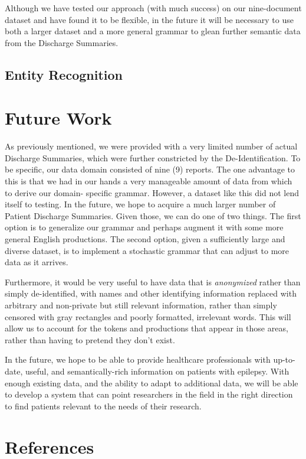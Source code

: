 \documentclass{acm_proc_article-sp}
\begin{document}
Although we have tested our approach (with much success) on our nine-document dataset and have found it
to be flexible, in the future it will be necessary
to use both a larger dataset and a more general grammar to glean further semantic
data from the Discharge Summaries.
\subsection{Entity Recognition}
\section{Future Work}
As previously mentioned, we were provided with a very limited number of actual Discharge
Summaries, which were further constricted by the De-Identification. To be specific,
our data domain consisted of nine (9) reports. The one advantage to this is that we
had in our hands a very manageable amount of data from which to derive our domain-
specific grammar. However, a dataset like this did not lend itself to testing. In
the future, we hope to acquire a much larger number of Patient Discharge Summaries.
Given those, we can do one of two things. The first option is to generalize our grammar
and perhaps augment it with some more general English productions. The second option,
given a sufficiently large and diverse dataset, is to implement a stochastic grammar
that can adjust to more data as it arrives.

Furthermore, it would be very useful to have data that is \emph{anonymized} rather
than simply de-identified, with names and other identifying information replaced
with arbitrary and non-private but still relevant information, rather than simply
censored with gray rectangles and poorly formatted, irrelevant words. This will allow
us to account for the tokens and productions that appear in those areas, rather than
having to pretend they don't exist.

In the future, we hope to be able to provide healthcare professionals with up-to-date,
useful, and semantically-rich information on patients with epilepsy. With enough
existing data, and the ability to adapt to additional data, we will be able to develop
a system that can point researchers in the field in the right direction to find patients
relevant to the needs of their research.
\section{References}
{}

\end{document}
